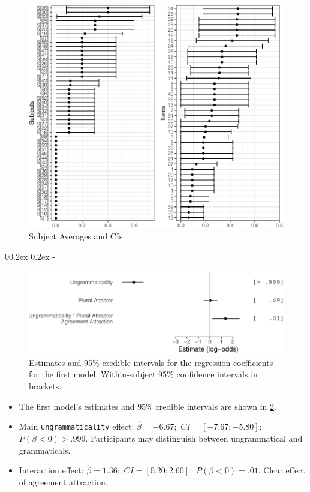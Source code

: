 \documentclass[
  10pt,
  english,
  doc,floatsintext]{apa6}
\makeatletter
\providecommand{\tightlist}{%
  \setlength{\itemsep}{0pt}\setlength{\parskip}{0pt}}
\let\oldsubparagraph\subparagraph
\renewcommand{\subparagraph}[1]{\oldsubparagraph{#1}\mbox{}}
\renewcommand{\subparagraph}[1]{\@startsection{subparagraph}{5}{1em}%
  {0\baselineskip \@plus 0.2ex \@minus 0.2ex}%
  {-\z@\relax}%
  {\normalfont\normalsize\itshape\hspace{\parindent}{#1}\textit{\addperi}}{\relax}}
\makeatother
\begin{document}
\begin{figure}
\centering
\includegraphics{paperdraft_files/figure-latex/GBiasSubjDiff-1.pdf}
\caption{\label{fig:GBiasSubjDiff}Subject Averages and CIs}
\end{figure}

\hypertarget{modelling-2}{%
\subparagraph{Modelling}\label{modelling-2}}

\begin{figure}
\centering
\includegraphics{paperdraft_files/figure-latex/Model2-1.pdf}
\caption{\label{fig:Model2}Estimates and 95\% credible intervals for the regression coefficients for the first model. Within-subject 95\% confidence intervals in brackets.}
\end{figure}

\begin{itemize}
\tightlist
\item
  The first model's estimates and 95\% credible intervals are shown in \ref{fig:Model2}.
\item
  Main \texttt{ungrammaticality} effect: \(\hat{\beta}=-6.67;\) \(CI=[-7.67; -5.80];\) \(P(\beta<0)> .999\). Participants may distinguish between ungrammatical and grammaticals.
\item
  Interaction effect: \(\hat{\beta}=1.36;\) \(CI=[0.20; 2.60];\) \(P(\beta<0)= .01\). Clear effect of agreement attraction.
\end{itemize}
\end{document}
